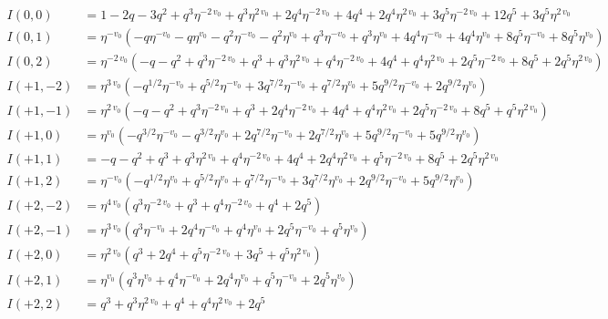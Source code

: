 \documentclass[11pt,a4paper]{article}
\begin{document}
\begin{align*}
I(0, 0) &= 1 - 2 q - 3 q^{2} + q^{3} \eta^{-2 \, v_{0}} + q^{3} \eta^{2 \, v_{0}} + 2 q^{4} \eta^{-2 \, v_{0}} + 4 q^{4} + 2 q^{4} \eta^{2 \, v_{0}} + 3 q^{5} \eta^{-2 \, v_{0}} + 12 q^{5} + 3 q^{5} \eta^{2 \, v_{0}} \\
I(0, 1) &= \eta^{-v_{0}} \left( -q \eta^{-v_{0}} - q \eta^{v_{0}} - q^{2} \eta^{-v_{0}} - q^{2} \eta^{v_{0}} + q^{3} \eta^{-v_{0}} + q^{3} \eta^{v_{0}} + 4 q^{4} \eta^{-v_{0}} + 4 q^{4} \eta^{v_{0}} + 8 q^{5} \eta^{-v_{0}} + 8 q^{5} \eta^{v_{0}} \right) \\
I(0, 2) &= \eta^{-2 \, v_{0}} \left( -q - q^{2} + q^{3} \eta^{-2 \, v_{0}} + q^{3} + q^{3} \eta^{2 \, v_{0}} + q^{4} \eta^{-2 \, v_{0}} + 4 q^{4} + q^{4} \eta^{2 \, v_{0}} + 2 q^{5} \eta^{-2 \, v_{0}} + 8 q^{5} + 2 q^{5} \eta^{2 \, v_{0}} \right) \\
I(+1, -2) &= \eta^{3 \, v_{0}} \left( -q^{1/2} \eta^{-v_{0}} + q^{5/2} \eta^{-v_{0}} + 3 q^{7/2} \eta^{-v_{0}} + q^{7/2} \eta^{v_{0}} + 5 q^{9/2} \eta^{-v_{0}} + 2 q^{9/2} \eta^{v_{0}} \right) \\
I(+1, -1) &= \eta^{2 \, v_{0}} \left( -q - q^{2} + q^{3} \eta^{-2 \, v_{0}} + q^{3} + 2 q^{4} \eta^{-2 \, v_{0}} + 4 q^{4} + q^{4} \eta^{2 \, v_{0}} + 2 q^{5} \eta^{-2 \, v_{0}} + 8 q^{5} + q^{5} \eta^{2 \, v_{0}} \right) \\
I(+1, 0) &= \eta^{v_{0}} \left( -q^{3/2} \eta^{-v_{0}} - q^{3/2} \eta^{v_{0}} + 2 q^{7/2} \eta^{-v_{0}} + 2 q^{7/2} \eta^{v_{0}} + 5 q^{9/2} \eta^{-v_{0}} + 5 q^{9/2} \eta^{v_{0}} \right) \\
I(+1, 1) &= -q - q^{2} + q^{3} + q^{3} \eta^{2 \, v_{0}} + q^{4} \eta^{-2 \, v_{0}} + 4 q^{4} + 2 q^{4} \eta^{2 \, v_{0}} + q^{5} \eta^{-2 \, v_{0}} + 8 q^{5} + 2 q^{5} \eta^{2 \, v_{0}} \\
I(+1, 2) &= \eta^{-v_{0}} \left( -q^{1/2} \eta^{v_{0}} + q^{5/2} \eta^{v_{0}} + q^{7/2} \eta^{-v_{0}} + 3 q^{7/2} \eta^{v_{0}} + 2 q^{9/2} \eta^{-v_{0}} + 5 q^{9/2} \eta^{v_{0}} \right) \\
I(+2, -2) &= \eta^{4 \, v_{0}} \left( q^{3} \eta^{-2 \, v_{0}} + q^{3} + q^{4} \eta^{-2 \, v_{0}} + q^{4} + 2 q^{5} \right) \\
I(+2, -1) &= \eta^{3 \, v_{0}} \left( q^{3} \eta^{-v_{0}} + 2 q^{4} \eta^{-v_{0}} + q^{4} \eta^{v_{0}} + 2 q^{5} \eta^{-v_{0}} + q^{5} \eta^{v_{0}} \right) \\
I(+2, 0) &= \eta^{2 \, v_{0}} \left( q^{3} + 2 q^{4} + q^{5} \eta^{-2 \, v_{0}} + 3 q^{5} + q^{5} \eta^{2 \, v_{0}} \right) \\
I(+2, 1) &= \eta^{v_{0}} \left( q^{3} \eta^{v_{0}} + q^{4} \eta^{-v_{0}} + 2 q^{4} \eta^{v_{0}} + q^{5} \eta^{-v_{0}} + 2 q^{5} \eta^{v_{0}} \right) \\
I(+2, 2) &= q^{3} + q^{3} \eta^{2 \, v_{0}} + q^{4} + q^{4} \eta^{2 \, v_{0}} + 2 q^{5} \\
\end{align*}
\end{document}
